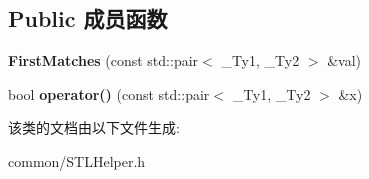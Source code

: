 \subsection*{Public 成员函数}
\begin{DoxyCompactItemize}
\item 
\hypertarget{class_first_matches_a6964abdaf90d1f3619325e174432fb5e}{{\bfseries First\+Matches} (const std\+::pair$<$ \+\_\+\+Ty1, \+\_\+\+Ty2 $>$ \&val)}\label{class_first_matches_a6964abdaf90d1f3619325e174432fb5e}

\item 
\hypertarget{class_first_matches_af673833b67ed716565797222971e6142}{bool {\bfseries operator()} (const std\+::pair$<$ \+\_\+\+Ty1, \+\_\+\+Ty2 $>$ \&x)}\label{class_first_matches_af673833b67ed716565797222971e6142}

\end{DoxyCompactItemize}


该类的文档由以下文件生成\+:\begin{DoxyCompactItemize}
\item 
common/S\+T\+L\+Helper.\+h\end{DoxyCompactItemize}
